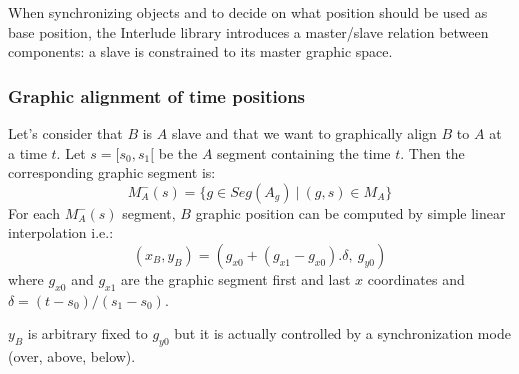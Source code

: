 \documentclass[twoside,10pt]{article}
\newcommand{\seg}[1]			{Seg(#1)}
\begin{document}
When synchronizing objects and to decide on what position should be used as base position, the Interlude library introduces a master/slave relation between components: a slave is constrained to its master graphic space.

\subsubsection{Graphic alignment of time positions}

Let's consider that $B$ is $A$ slave and that we want to graphically align $B$ to $A$ at a time $t$. Let $s=[s_0, s_1[$ be the $A$ segment containing the time $t$. Then the corresponding graphic segment is:
\[
M_A^{-}(s) =\{ g \in \seg{A_{g}}\ |\ (g,s)\in M_A\}
\]
For each $M_A^{-}(s)$ segment, $B$ graphic position can be computed by simple linear interpolation i.e.:
\[
(x_B, y_B) = (g_{x0} + (g_{x1} - g_{x0}). \delta,\ g_{y0})
\]
where $g_{x0}$ and $g_{x1}$ are the graphic segment first and last $x$ coordinates and 
$\delta = (t - s_0) / (s_1 - s_0)$.

$y_B$ is arbitrary fixed to $g_{y0}$ but it is actually controlled by a synchronization mode (over, above, below).


\end{document}
